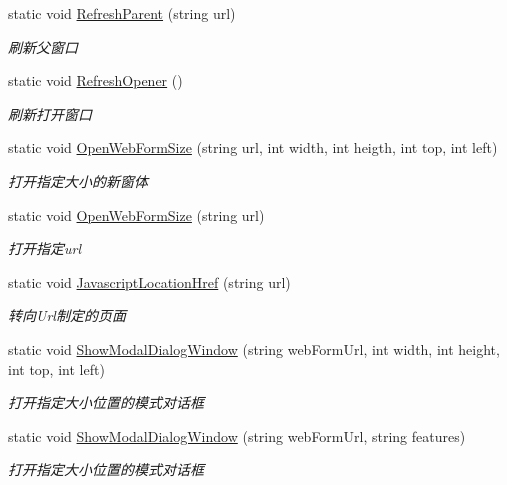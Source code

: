 \begin{DoxyCompactItemize}
static void \hyperlink{class_x_c_l_net_tools_1_1_javascript_1_1_jscript_a6f2c5e702c2381bd77f86463693340cb}{Refresh\-Parent} (string url)
\begin{DoxyCompactList}\small\item\em 刷新父窗口 \end{DoxyCompactList}\item 
static void \hyperlink{class_x_c_l_net_tools_1_1_javascript_1_1_jscript_ad0de2aa10ba5437ea797513703b50e64}{Refresh\-Opener} ()
\begin{DoxyCompactList}\small\item\em 刷新打开窗口 \end{DoxyCompactList}\item 
static void \hyperlink{class_x_c_l_net_tools_1_1_javascript_1_1_jscript_ab16b9ee41a91197d9517ecfb6920c2a5}{Open\-Web\-Form\-Size} (string url, int width, int heigth, int top, int left)
\begin{DoxyCompactList}\small\item\em 打开指定大小的新窗体 \end{DoxyCompactList}\item 
static void \hyperlink{class_x_c_l_net_tools_1_1_javascript_1_1_jscript_aba38ab9b4225ae46f2a2b043ae90cbfd}{Open\-Web\-Form\-Size} (string url)
\begin{DoxyCompactList}\small\item\em 打开指定url \end{DoxyCompactList}\item 
static void \hyperlink{class_x_c_l_net_tools_1_1_javascript_1_1_jscript_a2e3575f945821f03bbbfeaf97503eab7}{Javascript\-Location\-Href} (string url)
\begin{DoxyCompactList}\small\item\em 转向\-Url制定的页面 \end{DoxyCompactList}\item 
static void \hyperlink{class_x_c_l_net_tools_1_1_javascript_1_1_jscript_a2a6b3bcc01894290fbbf4835a328d396}{Show\-Modal\-Dialog\-Window} (string web\-Form\-Url, int width, int height, int top, int left)
\begin{DoxyCompactList}\small\item\em 打开指定大小位置的模式对话框 \end{DoxyCompactList}\item 
static void \hyperlink{class_x_c_l_net_tools_1_1_javascript_1_1_jscript_a793a61a17a63b03dca9adb8f0523f5bf}{Show\-Modal\-Dialog\-Window} (string web\-Form\-Url, string features)
\begin{DoxyCompactList}\small\item\em 打开指定大小位置的模式对话框 \end{DoxyCompactList}\item 

\end{DoxyCompactItemize}

